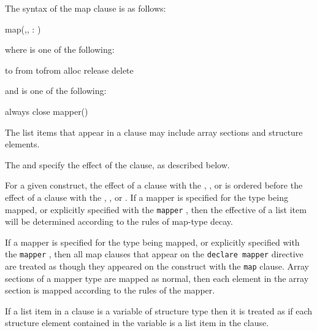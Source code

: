 \syntax
The syntax of the map clause is as follows:

\begin{ompSyntax}
map(\plc{[ [map-type-modifier[},\plc{] [map-type-modifier[},\plc{] ...] map-type} : \plc{] locator-list})
\end{ompSyntax}

where  is one of the following:

\begin{indentedcodelist}
to
from
tofrom
alloc
release
delete
\end{indentedcodelist}

and  is one of the following:

\begin{indentedcodelist}
always
close
mapper()
\end{indentedcodelist}

\descr
The list items that appear in a  clause may include array sections and structure elements.



The  and  specify the effect of the  clause, as described below.

For a given construct, the effect of a  clause with the ,
, or   is ordered before the effect of a
 clause with the , , or 
. If a mapper is specified for the type being mapped, or
explicitly specified with the \verb`mapper` , then the
effective  of a list item will be determined according to the
rules of map-type decay.

If a mapper is specified for the type being mapped, or explicitly specified with
the \verb`mapper` , then all map clauses that appear on the
\verb`declare mapper` directive are treated as though they appeared on the
construct with the \verb`map` clause.  Array sections of a mapper type are
mapped as normal, then each element in the array section is mapped according to
the rules of the mapper.

\begin{ccppspecific}
If a list item in a  clause is a variable of structure type then it
is treated as if each structure element contained in the variable is a list
item in the clause.
\end{ccppspecific}

